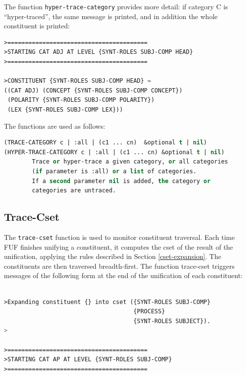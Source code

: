 \documentclass[10pt,a4paper]{report}
\begin{document}
The function {\tt hyper-trace-category} provides more detail: if category C
is ``hyper-traced'', the same message is printed, and in addition the whole
constituent is printed:

\begin{lstlisting}[language=Lisp]
>========================================
>STARTING CAT ADJ AT LEVEL {SYNT-ROLES SUBJ-COMP HEAD}
>========================================

>CONSTITUENT {SYNT-ROLES SUBJ-COMP HEAD} =
((CAT ADJ) (CONCEPT {SYNT-ROLES SUBJ-COMP CONCEPT})
 (POLARITY {SYNT-ROLES SUBJ-COMP POLARITY})
 (LEX {SYNT-ROLES SUBJ-COMP LEX}))
\end{lstlisting}

The functions are used as follows:
\begin{lstlisting}[language=Lisp]
(TRACE-CATEGORY c | :all | (c1 ... cn)  &optional t | nil)
(HYPER-TRACE-CATEGORY c | :all | (c1 ... cn) &optional t | nil)
		Trace or hyper-trace a given category, or all categories
		(if parameter is :all) or a list of categories.
		If a second parameter nil is added, the category or 
		categories are untraced.
\end{lstlisting}


\subsection{Trace-Cset}


The {\tt trace-cset} function is used to monitor constituent traversal.  Each
time FUF finishes unifying a constituent, it computes the cset of the
result of the unification, applying the rules described in Section
\ref{cset-expansion}.  The constituents are then traversed breadth-first.
The function trace-cset triggers messages of the following form at the end
of the unification of each constituent:

\begin{lstlisting}[language=Lisp]

>Expanding constituent {} into cset ({SYNT-ROLES SUBJ-COMP}
                                     {PROCESS}
                                     {SYNT-ROLES SUBJECT}).
>

>========================================
>STARTING CAT AP AT LEVEL {SYNT-ROLES SUBJ-COMP}
>========================================

\end{lstlisting}
\end{document}
